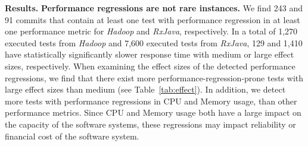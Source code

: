  \textbf{Results.}
\textbf{Performance regressions are not rare instances.} We find 243 and 91 commits that contain at least one test with performance regression in at least one performance metric for \emph{Hadoop} and \emph{RxJava}, respectively. In a total of 1,270 executed tests from \emph{Hadoop} and 7,600 executed tests from \emph{RxJava}, 129 and 1,410 have statistically significantly slower response time with medium or large effect sizes, respectively. When examining the effect sizes of the detected performance regressions, we find that there exist more performance-regression-prone tests with large effect sizes than medium (see Table~\ref{tab:effect}). In addition, we detect more tests with performance regressions in CPU and Memory usage, than other performance metrics. Since CPU and Memory usage both have a large impact on the capacity of the software systems, these regressions may impact reliability or financial cost of the software system. 
